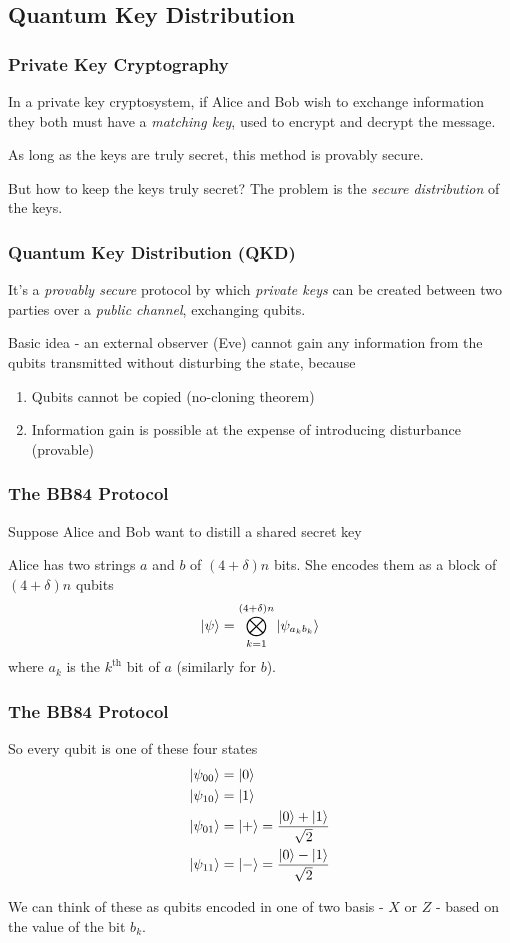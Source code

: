 \documentclass{beamer}
\begin{document}
  \subsection{Quantum Key Distribution}
  \begin{frame}
    \frametitle{Private Key Cryptography}
    In a private key cryptosystem, if Alice and Bob wish to exchange information they
    both must have a \textit{matching key}, used to encrypt and decrypt the message.

    As long as the keys are truly secret, this method is provably secure.

    But how to keep the keys truly secret? The problem is the \textit{secure distribution}
    of the keys.
  \end{frame}
  \begin{frame}
    \frametitle{Quantum Key Distribution (QKD)}
    It's a \textit{provably secure} protocol by which \textit{private keys} can be created
    between two parties over a \textit{public channel}, exchanging qubits.

    Basic idea - an external observer (Eve) cannot gain any information from the qubits
    transmitted without disturbing the state, because
    \begin{enumerate}
      \item<1-> Qubits cannot be copied (no-cloning theorem)
      \item<2-> Information gain is possible at the expense of introducing disturbance (provable)
    \end{enumerate}
  \end{frame}
  \begin{frame}
    \frametitle{The BB84 Protocol}
    Suppose Alice and Bob want to distill a shared secret key
    
    Alice has two strings $a$ and $b$ of $(4+\delta)n$ bits.
    She encodes them as a block of $(4+\delta)n$ qubits
    \begin{equation*}
      \ket{\psi} = \bigotimes_{k=1}^{(4+\delta)n} \ket{\psi_{a_kb_k}}
    \end{equation*}
    where $a_k$ is the $k^\text{th}$ bit of $a$ (similarly for $b$).
  \end{frame}

  \begin{frame}
    \frametitle{The BB84 Protocol}
    So every qubit is one of these four states
    \begin{align*}
      \ket{\psi_{00}} &= \ket{0} \\
      \ket{\psi_{10}} &= \ket{1} \\
      \ket{\psi_{01}} &= \ket{+} = \frac{\ket0 + \ket1}{\sqrt2} \\
      \ket{\psi_{11}} &= \ket{-} = \frac{\ket0 - \ket1}{\sqrt2}
    \end{align*}

    We can think of these as qubits encoded in one of two basis - $X$ or $Z$ - based
    on the value of the bit $b_k$.
  \end{frame}
\end{document}

